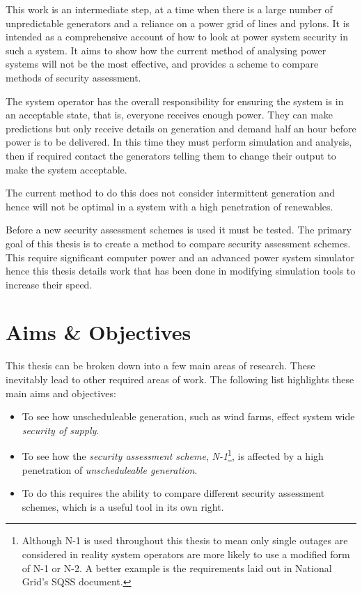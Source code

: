 \documentclass[a4paper,oneside,12pt]{report}
\begin{document}
This work is an intermediate step, at a time when there is a large number of unpredictable generators and a reliance on a power grid of lines and pylons. It is intended as a comprehensive account of how to look at power system security in such a system. It aims to show how the current method of analysing power systems will not be the most effective, and provides a scheme to compare methods of security assessment.

The system operator has the overall responsibility for ensuring the system is in an acceptable state, that is, everyone receives enough power. They can make predictions but only receive details on generation and demand half an hour before power is to be delivered. In this time they must perform simulation and analysis, then if required contact the generators telling them to change their output to make the system acceptable.

The current method to do this does not consider intermittent generation and hence will not be optimal in a system with a high penetration of renewables.

Before a new security assessment schemes is used it must be tested. The primary goal of this thesis is to create a method to compare security assessment schemes. This require significant computer power and an advanced power system simulator hence this thesis details work that has been done in modifying simulation tools to increase their speed.

\section{Aims \& Objectives}

This thesis can be broken down into a few main areas of research. These inevitably lead to other required areas of work. The following list highlights these main aims and objectives:

\begin{itemize}
\item To see how unscheduleable generation, such as wind farms, effect system wide \emph{security of supply}.
\item To see how the \emph{security assessment scheme}, \emph{N-1}\footnote{Although N-1 is used throughout this thesis to mean only single outages are considered in reality system operators are more likely to use a modified form of N-1 or N-2. A better example is the requirements laid out in National Grid's SQSS document.}, is affected by a high penetration of \emph{unscheduleable generation}.
\item To do this requires the ability to compare different security assessment schemes, which is a useful tool in its own right.
\end{itemize}
\end{document}
